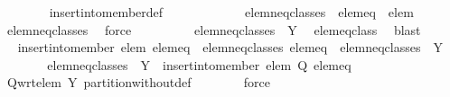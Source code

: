 \begin{isabellebody}
\ \ \ \ \ \ \isamarkupfalse%
\ insert{\isacharunderscore}into{\isacharunderscore}member{\isacharunderscore}def\ \isacommand{{\isachardot}{\isachardot}}\isamarkupfalse%
\isanewline
\ \ \ \ \isamarkupfalse%
\ \isamarkupfalse%
\ {\isachardoublequoteopen}{\isasymdots}\ {\isacharequal}\ {\isacharparenleft}{\isacharbraceleft}{\isacharbraceright}\ {\isasymunion}\ {\isacharquery}elem{\isacharunderscore}neq{\isacharunderscore}classes{\isacharparenright}\ {\isasymunion}\ {\isacharbraceleft}{\isacharquery}elem{\isacharunderscore}eq\ {\isasymunion}\ {\isacharbraceleft}elem{\isacharbraceright}{\isacharbraceright}{\isachardoublequoteclose}\ \isamarkupfalse%
\ elem{\isacharunderscore}neq{\isacharunderscore}classes\ \isamarkupfalse%
\ force\isanewline
\ \ \ \ \isamarkupfalse%
\ \isamarkupfalse%
\ {\isachardoublequoteopen}{\isasymdots}\ {\isacharequal}\ {\isacharquery}elem{\isacharunderscore}neq{\isacharunderscore}classes\ {\isasymunion}\ {\isacharbraceleft}Y{\isacharbraceright}{\isachardoublequoteclose}\ \isamarkupfalse%
\ elem{\isacharunderscore}eq{\isacharunderscore}class\ \isamarkupfalse%
\ blast\isanewline
\ \ \ \ \isamarkupfalse%
\ \isamarkupfalse%
\ {\isachardoublequoteopen}insert{\isacharunderscore}into{\isacharunderscore}member\ elem\ {\isacharparenleft}{\isacharbraceleft}{\isacharquery}elem{\isacharunderscore}eq{\isacharbraceright}\ {\isasymunion}\ {\isacharquery}elem{\isacharunderscore}neq{\isacharunderscore}classes{\isacharparenright}\ {\isacharquery}elem{\isacharunderscore}eq\ {\isacharequal}\ {\isacharquery}elem{\isacharunderscore}neq{\isacharunderscore}classes\ {\isasymunion}\ {\isacharbraceleft}Y{\isacharbraceright}{\isachardoublequoteclose}\ \isacommand{{\isachardot}}\isamarkupfalse%
\isanewline
\ \ \ \ \isamarkupfalse%
\ \isamarkupfalse%
\ {\isachardoublequoteopen}{\isacharquery}elem{\isacharunderscore}neq{\isacharunderscore}classes\ {\isasymunion}\ {\isacharbraceleft}Y{\isacharbraceright}\ {\isacharequal}\ insert{\isacharunderscore}into{\isacharunderscore}member\ elem\ {\isacharquery}Q\ {\isacharquery}elem{\isacharunderscore}eq{\isachardoublequoteclose}\isanewline
\ \ \ \ \ \ \isamarkupfalse%
\ Q{\isacharunderscore}wrt{\isacharunderscore}elem\ Y{\isacharprime}\ partition{\isacharunderscore}without{\isacharunderscore}def\isanewline
\ \ \ \ \ \ \isamarkupfalse%
\ force\isanewline
\ \ \ \ \isamarkupfalse%

\end{isabellebody}
